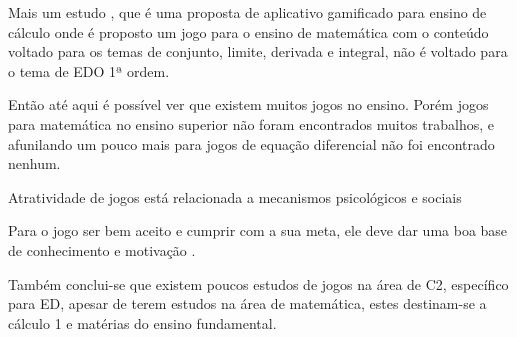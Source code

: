 Mais um estudo \cite{appcalculo}, que é uma proposta de aplicativo gamificado para ensino de cálculo onde é proposto um jogo para o ensino de matemática com o conteúdo voltado para os temas de  conjunto, limite, derivada e integral, não é voltado para o tema de EDO 1ª ordem.

Então até aqui é possível ver que existem muitos jogos no ensino. Porém jogos para matemática no ensino superior não foram encontrados muitos trabalhos, e afunilando um pouco mais para jogos de equação diferencial não foi encontrado nenhum.

Atratividade de jogos está relacionada a mecanismos psicológicos e sociais \cite{sucessoJogoEngSoft}

Para o jogo ser bem aceito e cumprir com a sua meta, ele deve dar uma boa base de conhecimento e motivação \cite{sucessoJogoEngSoft}.

Também conclui-se que existem poucos estudos de jogos na área de C2, específico para ED, apesar de terem estudos na área de matemática, estes destinam-se a cálculo 1 e matérias do ensino fundamental.


\begin{comment}
Gamificação foca em elementos como desafios, níveis, avatar, conquistas, histórias, pontos (Gustavo Fortes Tondello, PhD). Esses elementos são utilizados para engajamento do jogador.

Completar missões e derrotar um chefão faz o jogador se sentir competente (Gustavo Fortes Tondello, PhD).
Ser capaz de escolher diferentes caminhos ou criar coisas diferentes faz o jogador se sentir autônomo (Gustavo Fortes Tondello, PhD).
\end{comment}

